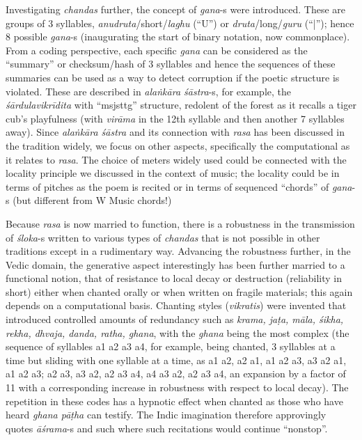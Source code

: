 Investigating \textsl{chandas} further, the concept of \textsl{gana}-s were introduced. These are groups of 3 syllables, \textsl{anudruta}/short/\textsl{laghu} (“U”) or \textsl{druta}/long/\textsl{guru} (“|”); hence 8 possible \textsl{gana}-s (inaugurating the start of binary notation, now commonplace). From a coding perspective, each specific \textsl{gana} can be considered as the “summary” or checksum/hash of 3 syllables and hence the sequences of these summaries can be used as a way to detect corruption if the poetic structure is violated. These are described in \textsl{alaṅkāra śāstra}-s, for example, the \textsl{śārdulavikrīdita} with “msjsttg” structure, redolent of the forest as it recalls a tiger cub’s playfulness (with \textsl{virāma} in the 12th syllable and then another 7 syllables away). Since \textsl{alaṅkāra śāstra} and its connection with \textsl{rasa} has been discussed in the tradition widely, we focus on other aspects, specifically the computational as it relates to \textsl{rasa}. The choice of meters widely used could be connected with the locality principle we discussed in the context of music; the locality could be in terms of pitches as the poem is recited or in terms of sequenced “chords” of \textsl{gana}-s (but different from W Music chords!)

Because \textsl{rasa} is now married to function, there is a robustness in the transmission of \textsl{śloka}-s written to various types of \textsl{chandas} that is not possible in other traditions except in a rudimentary way. Advancing the robustness further, in the Vedic domain, the generative aspect interestingly has been further married to a functional notion, that of resistance to local decay or destruction (reliability in short) either when chanted orally or when written on fragile materials; this again depends on a computational basis. Chanting styles (\textsl{vikratis}) were invented that introduced controlled amounts of redundancy such as \textsl{krama, jaṭa, māla, śikha, rekha, dhvaja, danda, ratha, ghana}, with the \textsl{ghana} being the most complex (the sequence of syllables a1 a2 a3 a4, for example, being chanted, 3 syllables at a time but sliding with one syllable at a time, as a1 a2, a2 a1, a1 a2 a3, a3 a2 a1, a1 a2 a3; a2 a3, a3 a2, a2 a3 a4, a4 a3 a2, a2 a3 a4, an expansion by a factor of 11 with a corresponding increase in robustness with respect to local decay). The repetition in these codes has a hypnotic effect when chanted as those who have heard \textsl{ghana pāṭha} can testify. The Indic imagination therefore approvingly quotes \textsl{āśrama}-s and such where such recitations would continue “nonstop”.

